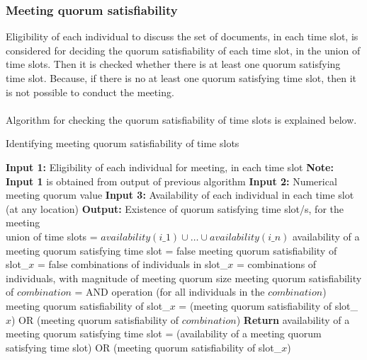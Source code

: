 \subsubsection{Meeting quorum satisfiability}
Eligibility of each individual to discuss the set of documents, in each time slot, is considered for deciding the quorum satisfiability of each time slot, in the union of time slots. Then it is checked whether there is at least one quorum satisfying time slot. Because, if there is no at least one quorum satisfying time slot, then it is not possible to conduct the meeting.\\ \\
Algorithm for checking the quorum satisfiability of time slots is explained below.
\begin{algorithm}[H]
    \caption{Identifying meeting quorum satisfiability of time slots}
    \begin{algorithmic}
        \State \textbf{Input 1:} Eligibility of each individual for meeting, in each time slot
        \State \textbf{Note:} \textbf{Input 1} is obtained from output of previous algorithm
        \State \textbf{Input 2:} Numerical meeting quorum value 
        \State \textbf{Input 3:} Availability of each individual in each time slot (at any location)
        \State \textbf{Output:} Existence of quorum satisfying time slot/s, for the meeting \\
        \State union of time slots = \(availability(i\_1) \cup \dots \cup availability(i\_n)\)
        \State availability of a meeting quorum satisfying time slot = false
            \State meeting quorum satisfiability of slot\_\(x\) = false
            \State combinations of individuals in slot\_\(x\) = combinations of individuals, with magnitude of meeting quorum size 
                \State meeting quorum satisfiability of \(combination\) = AND operation (for all individuals in the \(combination\))
                \State meeting quorum satisfiability of slot\_\(x\) = (meeting quorum satisfiability of slot\_\(x\)) OR (meeting quorum satisfiability of \(combination\))
            \EndFor
            \State \textbf{Return} availability of a meeting quorum satisfying time slot = (availability of a meeting quorum satisfying time slot) OR (meeting quorum satisfiability of slot\_\(x\))
        \EndFor
    \end{algorithmic}
\end{algorithm}
